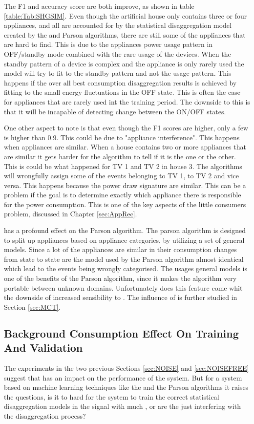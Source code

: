 The F1 and accuracy score are both improve, as shown in table \ref{table:Tab:SHGSIM}. Even though the artificial house only contains three or four appliances, and all are accounted for by the statistical disaggregation model created by the  and Parson algorithms, there are still some of the appliances that are hard to find. This is due to the appliances power usage pattern in OFF/standby mode combined with the rare usage of the devices. When the standby pattern of a device is complex and the appliance is only rarely used the model will try to fit to the standby pattern and not the usage pattern. This happens if the over all best consumption disaggregation results is achieved by fitting to the small energy fluctuations in the OFF state. This is often the case for appliances that are rarely used int the training period. The downside to this is that it will be incapable of detecting change between the ON/OFF states.

One other aspect to note is that even though the F1 scores are higher, only a few is higher than 0.9. 
This could be due to "appliance interference". This happens when appliances are similar. When a house contains two or more appliances that are similar it gets harder for the algorithm to tell if it is the one or the other. This is could be what happened for TV 1 and TV 2 in house 3. The algorithms will wrongfully assign some of the events belonging to TV 1, to TV 2 and vice versa. This happens because the power draw signature are similar.  This can be a problem if the goal is to determine exactly which appliance there is responsible for the power consumption. This is one of the key aspects of the little consumers problem, discussed in Chapter \ref{sec:AppRec}.

 has a profound effect on the Parson algorithm. The parson algorithm is designed to split up appliances based on appliance categories, by utilizing a set of general models. Since a lot of the appliances are similar in their consumption changes from state to state are the model used by the Parson algorithm almost identical which lead to the events being wrongly categorised. The usages general models is one of the benefits of the Parson algorithm, since it makes the algorithm very portable between unknown domains. Unfortunately does this feature come whit the downside of increased sensibility to . The influence of  is further studied in Section \ref{sec:MCT}. 

\subsection{Background Consumption Effect On Training And Validation }
The experiments in the two previous Sections \ref{sec:NOISE} and \ref{sec:NOISEFREE} suggest that  has an impact on the performance of the system. But for a system based on machine learning techniques like the  and the Parson algorithms it raises the questions, is it to hard for the system to train the correct statistical disaggregation models in the signal with much , or are the  just interfering with the disaggregation process? 

